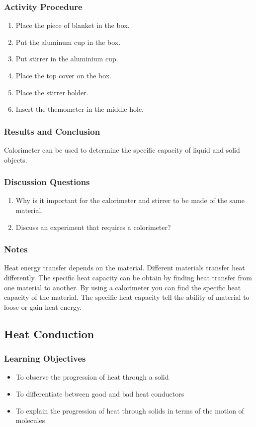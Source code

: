 \subsubsection*{Activity Procedure}
\begin{enumerate}
\item{Place the piece of blanket in the box.}
\item{Put the aluminum cup in the box.}
\item{Put stirrer in the aluminium cup.}
\item{Place the top cover on the box.}
\item{Place the stirrer holder.}
\item{Insert the themometer in the middle hole.}
\end{enumerate}

\subsubsection*{Results and Conclusion}
Calorimeter can be used to determine the specific capacity of liquid and solid objects.

\subsubsection*{Discussion Questions}
\begin{enumerate}
\item{Why is it important for the calorimeter and stirrer to be made of the same material.}
\item{Discuss an experiment that requires a colorimeter?}
\end{enumerate}

\subsubsection*{Notes}
Heat energy transfer depends on the material. Different materials transfer heat differently. The specific heat capacity can be obtain by finding heat transfer from one material to another. By using a calorimeter 
you can find the specific heat capacity of the material. The specific heat capacity tell the ability of material to loose or gain heat energy.

\subsection{Heat Conduction}

\subsubsection*{Learning Objectives}
\begin{itemize}
\item{To observe the progression of heat through a solid} 
\item{To differentiate between good and bad heat conductors} 
\item{To explain the progression of heat through solids in terms of the motion of molecules} 
\end{itemize}

